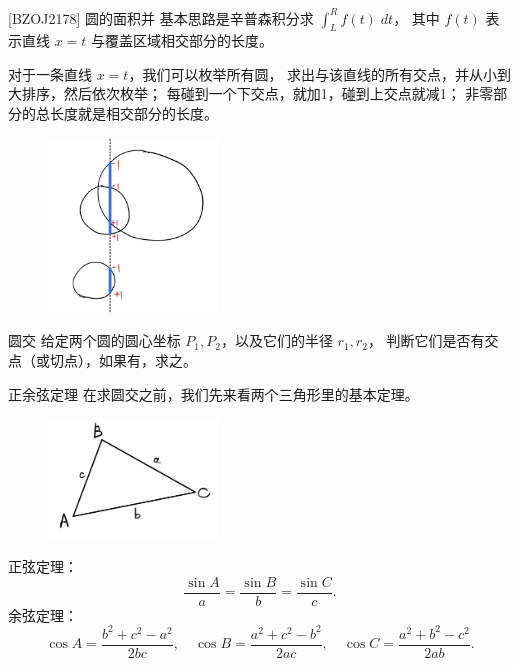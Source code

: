 \documentclass{beamer}
\begin{document}
\begin{frame}{[BZOJ2178] 圆的面积并}
    \footnotesize
    基本思路是辛普森积分求 $\int_L^R f(t)\; dt$，
    其中 $f(t)$ 表示直线 $x=t$ 与覆盖区域相交部分的长度。
    
    \vspace{1em}\pause
    对于一条直线 $x=t$，我们可以枚举所有圆，
    求出与该直线的所有交点，并从小到大排序，然后依次枚举；
    每碰到一个下交点，就加1，碰到上交点就减1；
    非零部分的总长度就是相交部分的长度。

    \begin{figure}[H]
        \centering
        \includegraphics[width=0.4\textwidth]{pic/circleinsec.jpg}
    \end{figure}
\end{frame}

\begin{frame}{圆交}
    \small
    给定两个圆的圆心坐标 $P_1,P_2$，以及它们的半径 $r_1,r_2$，
    判断它们是否有交点（或切点），如果有，求之。
\end{frame}

\begin{frame}{正余弦定理}
    \small
    在求圆交之前，我们先来看两个三角形里的基本定理。

    \vspace{1em}\pause
    \begin{figure}[H]
        \centering
        \includegraphics[width=0.4\textwidth]{pic/triangle.jpg}
    \end{figure}
    正弦定理：
    \begin{equation}
        \frac{\sin A}{a}=\frac{\sin B}{b}=\frac{\sin C}{c}.
    \end{equation}
    余弦定理：
    \begin{equation}
        \cos A=\frac{b^2+c^2-a^2}{2bc},\quad
        \cos B=\frac{a^2+c^2-b^2}{2ac},\quad
        \cos C=\frac{a^2+b^2-c^2}{2ab}. 
    \end{equation}
\end{frame}
\end{document}

